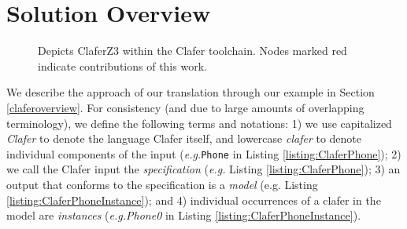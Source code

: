 \documentclass{easychair}
\newcommand{\eg}{\emph{e.g.}\xspace}
\begin{document}
\section{Solution Overview}
\label{solutionoverview}
\begin{figure}
\centering

\caption{Depicts ClaferZ3 within the Clafer toolchain. Nodes marked red indicate contributions of this work.}
\label{claferZ3toolchain}
\end{figure}
We describe the approach of our translation through our example in Section \ref{claferoverview}. For consistency (and due to large amounts of overlapping terminology), we define the following terms and notations: 1) we use capitalized \textit{Clafer} to denote the language Clafer itself, and lowercase \textit{clafer} to denote individual components of the input (\eg \texttt{Phone} in Listing \ref{listing:ClaferPhone}); 2) we call the Clafer input the \textit{specification} (\eg Listing \ref{listing:ClaferPhone}); 3) an output that conforms to the specification is a \textit{model} (e.g. Listing \ref{listing:ClaferPhoneInstance}); and 4) individual occurrences of a clafer in the model are \textit{instances} (\eg \textit{Phone0} in Listing \ref{listing:ClaferPhoneInstance}). \\
\end{document}
